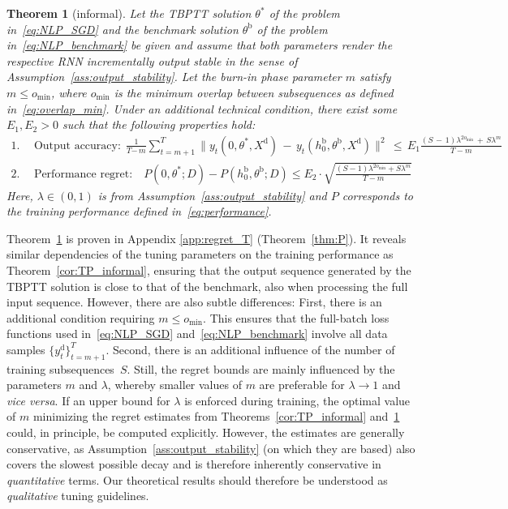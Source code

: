 \documentclass{article} %
\newtheorem{thm}{Theorem}
\begin{document}
\begin{thm}[informal]\label{thm:P_informal}
	Let the TBPTT solution $\theta^*$ of the problem in~\eqref{eq:NLP_SGD} and the benchmark solution $\theta^\mathrm{b}$ of the problem in~\eqref{eq:NLP_benchmark} be given and assume that both parameters render the respective RNN incrementally output stable in the sense of Assumption~\ref{ass:output_stability}. Let the burn-in phase parameter $m$ satisfy $ m\leq o_{\min}$, where $o_{\min}$ is the minimum overlap between subsequences as defined in~\eqref{eq:overlap_min}.
	Under an additional technical condition, there exist some $E_1,E_2>0$ such that the following properties hold:
	\begin{align*}
		1. & \ \  \text{Output accuracy:} \ \
		\frac{1}{T{-\,}m}\sum_{t=m+1}^{T} \|y_t(0,\theta^*,X^\mathrm{d}){\,-\,}y_t(h^\mathrm{b}_{0},\theta^\mathrm{b},X^\mathrm{d})\|^2 {\,\leq\, }  E_1
		\frac{(S{\,-\,}1)\lambda^{2o_{\min}}{\,+\,}S\lambda^m}{T-m}\\
		2. &\ \ \text{Performance regret:} \quad
		P(0,\theta^*;D) - P(h^\mathrm{b}_0,\theta^\mathrm{b};D) \leq  E_2\cdot \sqrt{\frac{(S-1)\lambda^{2o_{\min}} + S\lambda^m}{T-m}}
	\end{align*}
	Here, $\lambda\in(0,1)$ is from Assumption~\ref{ass:output_stability} and $P$ corresponds to the training performance defined in~\eqref{eq:performance}.
\end{thm}

Theorem~\ref{thm:P_informal} is proven in Appendix \ref{app:regret_T} (Theorem~\ref{thm:P}).
It reveals similar dependencies of the tuning parameters on the training performance as Theorem~\ref{cor:TP_informal}, ensuring that the output sequence generated by the TBPTT solution is close to that of the benchmark, also when processing the full input sequence.
However, there are also subtle differences:
First, there is an additional condition requiring $m\leq o_{\min}$. This ensures that the full-batch loss functions used in~\eqref{eq:NLP_SGD} and~\eqref{eq:NLP_benchmark} involve all data samples $\{y^\mathrm{d}_t\}_{t=m+1}^T$.
Second, there is an additional influence of the number of training subsequences~$S$.
Still, the regret bounds are mainly influenced by the parameters $m$ and $\lambda$, whereby smaller values of $m$ are preferable for $\lambda\rightarrow 1$ and \textit{vice versa}.
If an upper bound for $\lambda$ is enforced during training, the optimal value of $m$ minimizing the regret estimates from Theorems~\ref{cor:TP_informal} and~\ref{thm:P_informal} could, in principle, be computed explicitly.
However, the estimates are generally conservative, as Assumption~\ref{ass:output_stability} (on which they are based) also covers the slowest possible decay and is therefore inherently conservative in \emph{quantitative} terms. Our theoretical results should therefore be understood as \emph{qualitative} tuning guidelines.
	
\end{document}
